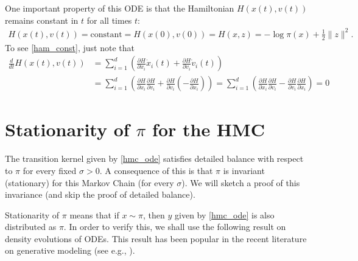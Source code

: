 \documentclass{scrartcl}
\begin{document}
One important property of this ODE is that the Hamiltonian $H(x(t),
v(t))$ remains constant in $t$ for all times $t$:
\begin{align}\label{ham_const}
  H(x(t), v(t)) = \text{constant} = H(x(0), v(0)) = H(x, z) = -\log
  \pi(x) + \frac{1}{2} \|z\|^2. 
\end{align}
To see \eqref{ham_const}, just note that
\begin{align*}
  \frac{d}{dt} H(x(t), v(t)) &= \sum_{i=1}^d \left( \frac{\partial H}{\partial
                               x_i} \dot{x}_i(t) + \frac{\partial
                               H}{\partial v_i} \dot{v}_i(t) \right) \\
  &= \sum_{i=1}^d \left(\frac{\partial H}{\partial x_i} \frac{\partial
    H}{\partial v_i} + \frac{\partial H}{\partial v_i} \left(-
    \frac{\partial H}{\partial x_i}\right) \right) = \sum_{i=1}^d \left(\frac{\partial H}{\partial x_i} \frac{\partial
    H}{\partial v_i} - \frac{\partial H}{\partial v_i} 
    \frac{\partial H}{\partial x_i} \right) = 0
\end{align*}

\section{Stationarity of $\pi$ for the HMC}

The transition kernel given by \eqref{hmc_ode} satisfies detailed
balance with respect to $\pi$ for every fixed $\sigma > 0$. A
consequence of this is that $\pi$ is invariant (stationary) for this
Markov Chain (for every $\sigma$). We will sketch a proof of this
invariance (and skip the proof of detailed balance).

Stationarity of $\pi$ means that if $x \sim \pi$, then $y$ given by
\eqref{hmc_ode} is also distributed as $\pi$. In order to verify this,
we shall use the following result on density evolutions of ODEs. This
result has been popular in the recent literature on generative
modeling (see e.g., \citet[Equation (5.2.8), Theorem 5.2.2, Section
B.1.2]{lai2025principles}).
\end{document}

